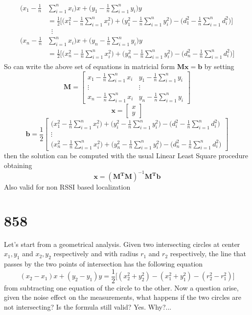 \documentclass[12pt]{report}
\begin{document}
\begin{align}
\begin{split} 
    \bigg(x_1-\frac{1}{n}&\sum_{i=1}^nx_i\bigg)x+\bigg(y_1-\frac{1}{n}\sum_{i=1}^ny_i\bigg)y\\
    &=\frac{1}{2}\bigg[\bigg(x_1^2-\frac{1}{n}\sum_{i=1}^nx^2_i\bigg)+\bigg(y_1^2-\frac{1}{n}\sum_{i=1}^ny^2_i\bigg)-\bigg(d_1^2-\frac{1}{n}\sum_{i=1}^nd_i^2\bigg)\bigg]\\
&\;\;\vdots\\
    \bigg(x_n-\frac{1}{n}&\sum_{i=1}^nx_i\bigg)x+\bigg(y_n-\frac{1}{n}\sum_{i=1}^ny_i\bigg)y\\
    &=\frac{1}{2}\bigg[\bigg(x_n^2-\frac{1}{n}\sum_{i=1}^nx^2_i\bigg)+\bigg(y_n^2-\frac{1}{n}\sum_{i=1}^ny^2_i\bigg)-\bigg(d_n^2-\frac{1}{n}\sum_{i=1}^nd_i^2\bigg)\bigg]
\end{split}
\end{align}
So can write the above set of equations in matricial form $\mathbf{Mx}=\mathbf{b}$ by setting
$$
\mathbf{M}=\begin{bmatrix}
    x_1-\frac{1}{n}\sum_{i=1}^nx_i&y_1-\frac{1}{n}\sum_{i=1}^ny_i\\
    \vdots&\vdots\\
    x_n-\frac{1}{n}\sum_{i=1}^nx_i&y_n-\frac{1}{n}\sum_{i=1}^ny_i
\end{bmatrix}
$$
$$
\mathbf{x}=\begin{bmatrix}
    x\\
    y
\end{bmatrix}
$$
$$\mathbf{b}=\frac{1}{2}
\begin{bmatrix}
\bigg(x_1^2-\frac{1}{n}\sum_{i=1}^nx^2_i\bigg)+\bigg(y_i^2-\frac{1}{n}\sum_{i=1}^ny^2_i\bigg)-\bigg(d_i^2-\frac{1}{n}\sum_{i=1}^nd_i^2\bigg)\\
\vdots\\
\bigg(x_n^2-\frac{1}{n}\sum_{i=1}^nx^2_i\bigg)+\bigg(y_n^2-\frac{1}{n}\sum_{i=1}^ny^2_i\bigg)-\bigg(d_n^2-\frac{1}{n}\sum_{i=1}^nd_i^2\bigg)
\end{bmatrix}
$$
then the solution can be computed with the usual Linear Least Square procedure obtaining
\begin{equation}
    \mathbf{x}=(\mathbf{M^TM})^{-1}\mathbf{M^Tb}
\end{equation}
Also valid for non RSSI based localization
\clearpage


\section{858}
Let's start from a geometrical analysis. Given two intersecting circles at center $x_{1},y_{1}$ and $x_{2},y_{2}$ respectively and with radius $r_1$ and $r_2$ respectively, the line that passes by the two points of intersection has the following equation
\begin{equation}
    (x_2-x_1)x+(y_2-y_1)y=\frac{1}{2}\big[(x_2^2+y_2^2)-(x_1^2+y_1^2)-(r_2^2-r_1^2)\big]
\end{equation}
from subtracting one equation of the circle to the other. Now a question arise, given the noise effect on the measurements, what happens if the two circles are not intersecting? Is the formula still valid? Yes. Why?... 
\end{document}
